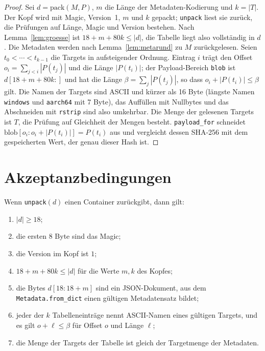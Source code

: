 \begin{proof}
	Sei $d=\mathrm{pack}(M,P)$, $m$ die Länge der Metadaten-Kodierung und $k=|T|$. Der Kopf wird mit Magic, Version~1, $m$ und $k$ gepackt; \texttt{unpack} liest sie zurück, die Prüfungen auf Länge, Magic und Version bestehen. Nach Lemma~\ref{lem:groesse} ist $18+m+80k\le|d|$, die Tabelle liegt also vollständig in $d$. Die Metadaten werden nach Lemma~\ref{lem:metarund} zu $M$ zurückgelesen. Seien $t_0<\cdots<t_{k-1}$ die Targets in aufsteigender Ordnung. Eintrag $i$ trägt den Offset $o_i=\sum_{j<i}|P(t_j)|$ und die Länge $|P(t_i)|$; der Payload-Bereich \texttt{blob} ist $d[18+m+80k:]$ und hat die Länge $\beta=\sum_j|P(t_j)|$, so dass $o_i+|P(t_i)|\le\beta$ gilt. Die Namen der Targets sind ASCII und kürzer als 16 Byte (längste Namen \texttt{windows} und \texttt{aarch64} mit 7 Byte), das Auffüllen mit Nullbytes und das Abschneiden mit \texttt{rstrip} sind also umkehrbar. Die Menge der gelesenen Targets ist $T$, die Prüfung auf Gleichheit der Mengen besteht. \texttt{payload\_for} schneidet $\mathrm{blob}[o_i:o_i+|P(t_i)|]=P(t_i)$ aus und vergleicht dessen SHA-256 mit dem gespeicherten Wert, der genau dieser Hash ist.
\end{proof}

\section{Akzeptanzbedingungen}

\begin{lemma}
	\label{lem:akzept}
	Wenn \texttt{unpack}$(d)$ einen Container zurückgibt, dann gilt:
	\begin{enumerate}[label=(S\arabic*)]
		\item $|d|\ge 18$;
		\item die ersten 8 Byte sind das Magic;
		\item die Version im Kopf ist $1$;
		\item $18+m+80k\le|d|$ für die Werte $m,k$ des Kopfes;
		\item die Bytes $d[18:18+m]$ sind ein JSON-Dokument, aus dem \texttt{Metadata.from\_dict} einen gültigen Metadatensatz bildet;
		\item jeder der $k$ Tabelleneinträge nennt ASCII-Namen eines gültigen Targets, und es gilt $o+\ell\le\beta$ für Offset $o$ und Länge $\ell$;
		\item die Menge der Targets der Tabelle ist gleich der Targetmenge der Metadaten.
	\end{enumerate}
\end{lemma}

